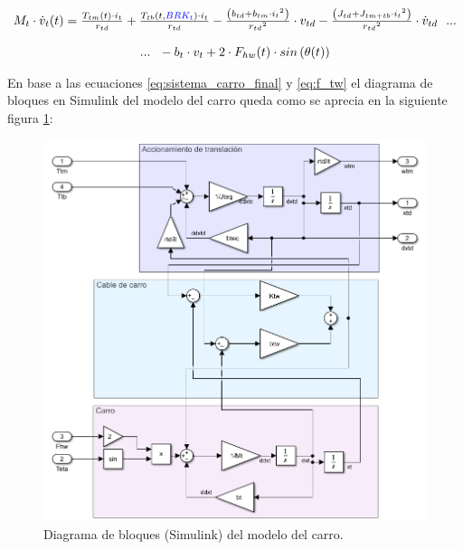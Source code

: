 \documentclass[11pt]{article}
\begin{document}
\begin{equation}
	\label{eq:sistema_carro_final}
	\begin{matrix}
		M_{t}\cdot\dot{v}_{t}(t)=\frac{T_{tm}(t)\cdot i_{t}}{r_{td}}+\frac{T_{tb}(t,{\color{blue}BRK_{t}})\cdot i_{t}}{r_{td}}-\frac{\left ( b_{td}+b_{tm}\cdot{i_{t}}^{2} \right )}{{r_{td}}^{2}}\cdot v_{td}-\frac{\left ( J_{td}+J_{tm+tb}\cdot{i_{t}}^{2} \right )}{{r_{td}}^{2}}\cdot \dot{v}_{td}\ \ ...
		\\
		\\
		...\ \ -b_{t}\cdot v_{t}+2\cdot F_{hw}(t) \cdot sin \left ( \theta(t) \right )
	\end{matrix}
\end{equation}

En base a las ecuaciones \ref{eq:sistema_carro_final} y \ref{eq:f_tw} el diagrama de bloques en Simulink del modelo del carro queda como se aprecia en la siguiente figura \ref{fig:sistema_carro_simulink}:

\begin{figure}[h!]
	\centering
	\includegraphics[width=1\textwidth]{images/imagen_3_simulink_carro.png}
	\caption{Diagrama de bloques (Simulink) del modelo del carro.}
	\label{fig:sistema_carro_simulink}
\end{figure}

\newpage
\end{document}
